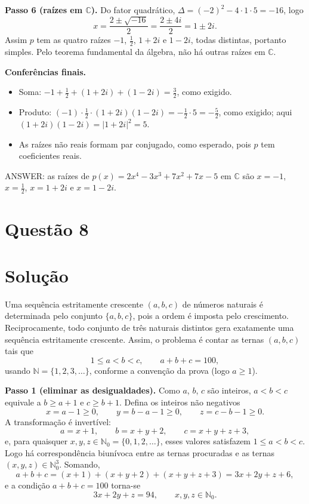 \documentclass{article}%
\begin{document}
\textbf{Passo 6 (raízes em $\mathbb{C}$).} Do fator quadrático, $\Delta=(-2)^2-4\cdot 1\cdot 5=-16$, logo
\[
x=\frac{2\pm\sqrt{-16}}{2}=\frac{2\pm 4i}{2}=1\pm 2i .
\]
Assim $p$ tem as quatro raízes $-1$, $\frac12$, $1+2i$ e $1-2i$, todas distintas, portanto simples. Pelo teorema fundamental da álgebra, não há outras raízes em $\mathbb{C}$.

\textbf{Conferências finais.}
\begin{itemize}
\item Soma: $-1+\frac12+(1+2i)+(1-2i)=\frac32$, como exigido.
\item Produto: $(-1)\cdot\frac12\cdot(1+2i)(1-2i)=-\frac12\cdot 5=-\frac52$, como exigido; aqui $(1+2i)(1-2i)=|1+2i|^2=5$.
\item As raízes não reais formam par conjugado, como esperado, pois $p$ tem coeficientes reais.
\end{itemize}

ANSWER: as raízes de $p(x)=2x^4-3x^3+7x^2+7x-5$ em $\mathbb{C}$ são $x=-1$, $x=\frac{1}{2}$, $x=1+2i$ e $x=1-2i$.%
\newpage%
\section*{Questão 8}

\section*{Solução}

Uma sequência estritamente crescente $(a,b,c)$ de números naturais é determinada pelo conjunto $\{a,b,c\}$, pois a ordem é imposta pelo crescimento. Reciprocamente, todo conjunto de três naturais distintos gera exatamente uma sequência estritamente crescente. Assim, o problema é contar as ternas $(a,b,c)$ tais que
\[
1 \le a < b < c, \qquad a+b+c = 100,
\]
usando $\mathbb{N}=\{1,2,3,\ldots\}$, conforme a convenção da prova (logo $a \ge 1$).

\textbf{Passo 1 (eliminar as desigualdades).} Como $a$, $b$, $c$ são inteiros, $a<b<c$ equivale a $b \ge a+1$ e $c \ge b+1$. Defina os inteiros não negativos
\[
x = a-1 \ge 0, \qquad y = b-a-1 \ge 0, \qquad z = c-b-1 \ge 0.
\]
A transformação é invertível:
\[
a = x+1, \qquad b = x+y+2, \qquad c = x+y+z+3,
\]
e, para quaisquer $x,y,z \in \mathbb{N}_0=\{0,1,2,\ldots\}$, esses valores satisfazem $1 \le a < b < c$. Logo há correspondência biunívoca entre as ternas procuradas e as ternas $(x,y,z) \in \mathbb{N}_0^3$. Somando,
\[
a+b+c = (x+1)+(x+y+2)+(x+y+z+3) = 3x+2y+z+6,
\]
e a condição $a+b+c=100$ torna-se
\[
3x+2y+z = 94, \qquad x,y,z \in \mathbb{N}_0. \tag{1}
\]
\end{document}
